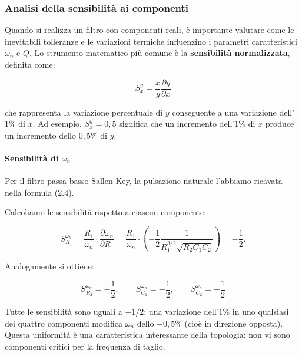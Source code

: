 \subsubsection{Analisi della sensibilità ai componenti}
\label{sec:sensitivita}

Quando si realizza un filtro con componenti reali, è importante valutare come le inevitabili tolleranze e le variazioni termiche influenzino i parametri caratteristici \(\omega_n\) e \(Q\). Lo strumento matematico più comune è la \textbf{sensibilità normalizzata}, definita come:

\begin{equation}
S_x^y = \frac{x}{y} \frac{\partial y}{\partial x}
\label{eq:def_sensibilita LP}
\end{equation}

che rappresenta la variazione percentuale di \(y\) conseguente a una variazione dell'\(1\%\) di \(x\). Ad esempio, \(S_x^y = 0,5\) significa che un incremento dell'\(1\%\) di \(x\) produce un incremento dello \(0,5\%\) di \(y\).

\paragraph{Sensibilità di \(\omega_n\)}

Per il filtro passa-basso Sallen-Key, la pulsazione naturale l'abbiamo ricavata nella formula (2.4).

Calcoliamo le sensibilità rispetto a ciascun componente:

\begin{equation}
S_{R_1}^{\omega_n} = \frac{R_1}{\omega_n} \cdot \frac{\partial \omega_n}{\partial R_1}
= \frac{R_1}{\omega_n} \cdot \left( -\frac{1}{2} \frac{1}{R_1^{3/2} \sqrt{R_2 C_1 C_2}} \right)
= -\frac{1}{2}.
\label{eq:S_R1_wn LP}
\end{equation}

Analogamente si ottiene:

\begin{equation}
S_{R_2}^{\omega_n} = -\frac{1}{2},\qquad 
S_{C_1}^{\omega_n} = -\frac{1}{2},\qquad 
S_{C_2}^{\omega_n} = -\frac{1}{2}
\label{eq:S_altre_wn LP}
\end{equation}

Tutte le sensibilità sono uguali a \(-1/2\): una variazione dell'\(1\%\) in uno qualsiasi dei quattro componenti modifica \(\omega_n\) dello \(-0,5\%\) (cioè in direzione opposta). Questa uniformità è una caratteristica interessante della topologia: non vi sono componenti critici per la frequenza di taglio.

